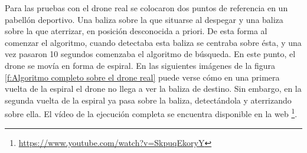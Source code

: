 \hspace{1cm} Para las pruebas con el drone real se colocaron dos puntos de referencia en un pabell\'on deportivo. Una baliza sobre la que situarse al despegar y una baliza sobre la que aterrizar, en posici\'on desconocida a priori. De esta forma al comenzar el algoritmo, cuando detectaba esta baliza se centraba sobre \'esta, y una vez pasaron 10 segundos comenzaba el algoritmo de b\'usqueda. En este punto, el drone se mov\'ia en forma de espiral. En las siguientes im\'agenes de la figura \ref{f:Algoritmo completo sobre el drone real} puede verse c\'omo en una primera vuelta de la espiral el drone no llega a ver la baliza de destino. Sin embargo, en la segunda vuelta de la espiral ya pasa sobre la baliza, detect\'andola y aterrizando sobre ella. El v\'ideo de la ejecuci\'on completa se encuentra disponible en la web \footnote{\url{https://www.youtube.com/watch?v=SkpuqEkoryY}}.



